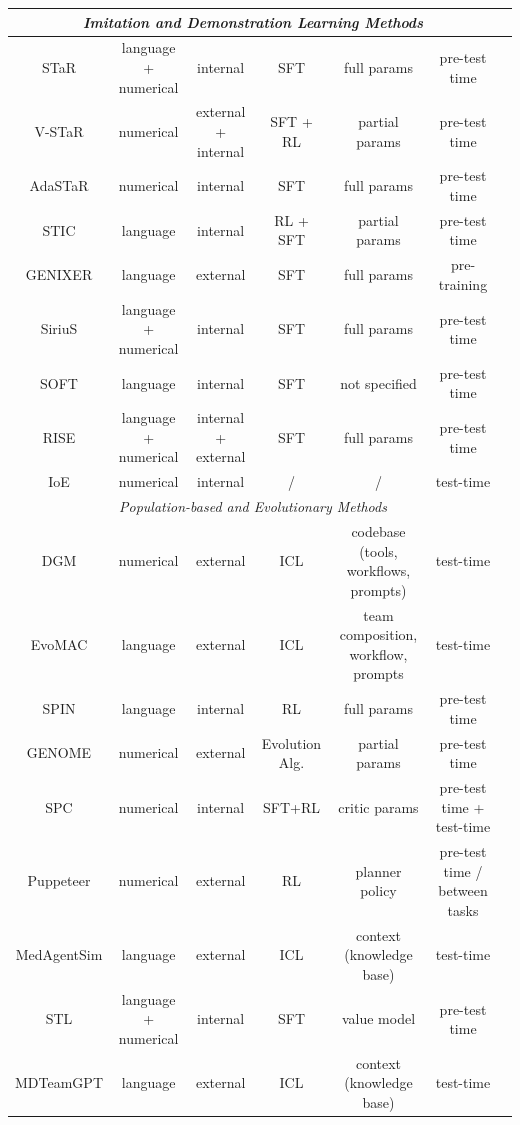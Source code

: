 \documentclass[10pt]{article} %
\begin{document}
\begin{table}[!t]
{\begin{tabular}{ccccccc}
\multicolumn{6}{c}{\textit{Imitation and Demonstration Learning Methods}} \\\midrule
STaR\citep{zelikman2022star} & language + numerical & internal & SFT & full params & pre-test time  \\
V-STaR\citep{hosseini2024v} & numerical & external + internal & SFT + RL & partial params & pre-test time \\
AdaSTaR\citep{koh2025adastar} & numerical & internal & SFT & full params  & pre-test time \\
STIC\citep{deng2024enhancing} & language & internal & RL + SFT & partial params & pre-test time \\
GENIXER\citep{zhao2024genixer}& language & external & SFT & full params & pre-training  \\
SiriuS\citep{zhao2025sirius} & language + numerical & internal & SFT & full params & pre-test time \\
SOFT\citep{tang2025bridging} & language & internal & SFT & not specified & pre-test time \\
RISE\citep{qu2024recursive} & language + numerical & internal + external & SFT & full params & pre-test time  \\
IoE\citep{li2024confidence} & numerical & internal & / & / & test-time \\\midrule
\multicolumn{6}{c}{\textit{Population-based and Evolutionary Methods}} \\\midrule
DGM\citep{zhang2025darwin} & numerical & external & ICL & codebase (tools, workflows, prompts) & test-time \\
EvoMAC\citep{hu2024self} & language & external & ICL & team composition, workflow, prompts & test-time \\
SPIN\citep{chen2024self} & language & internal & RL & full params & pre-test time \\
GENOME\citep{zhang2025nature} & numerical & external & Evolution Alg. & partial params & pre-test time \\
SPC\citep{chen2025spc} & numerical & internal & SFT+RL & critic params & pre-test time + test-time \\
Puppeteer\citep{dang2025multi} & numerical & external & RL & planner policy & pre-test time / between tasks \\
MedAgentSim\citep{almansoori2025self} & language & external & ICL & context (knowledge base) & test-time \\
STL\citep{mendes2025language} & language + numerical & internal & SFT & value model & pre-test time \\
MDTeamGPT\citep{chen2025self} & language & external & ICL & context (knowledge base) & test-time \\
\bottomrule
\end{tabular}
}
\label{tab:imitation_learning}
\end{table}
\end{document}
